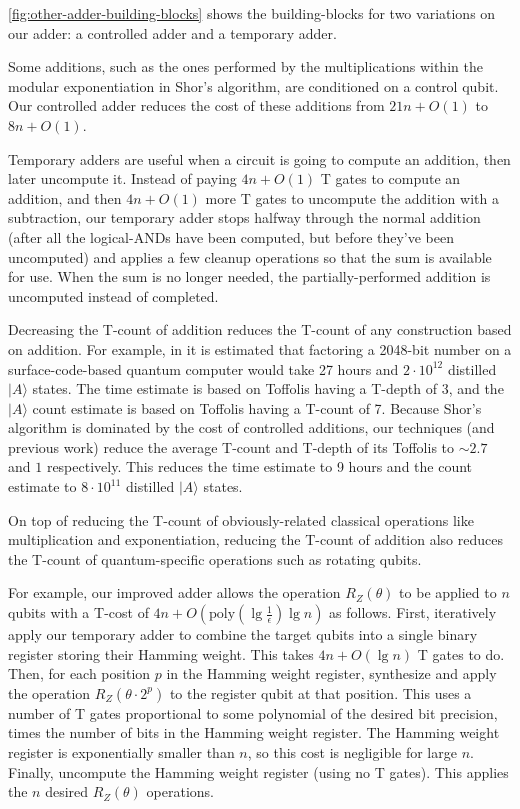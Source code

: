 \documentclass[twocolumn]{revtex4-1}
\begin{document}
\autoref{fig:other-adder-building-blocks} shows the building-blocks for two variations on our adder: a controlled adder and a temporary adder.

Some additions, such as the ones performed by the multiplications within the modular exponentiation in Shor's algorithm, are conditioned on a control qubit.
Our controlled adder reduces the cost of these additions from $21n + O(1)$ \citep{Coreas2017} to $8n + O(1)$.

Temporary adders are useful when a circuit is going to compute an addition, then later uncompute it.
Instead of paying $4n + O(1)$ T gates to compute an addition, and then $4n + O(1)$ more T gates to uncompute the addition with a subtraction, our temporary adder stops halfway through the normal addition (after all the logical-ANDs have been computed, but before they've been uncomputed) and applies a few cleanup operations so that the sum is available for use.
When the sum is no longer needed, the partially-performed addition is uncomputed instead of completed.


Decreasing the T-count of addition reduces the T-count of any construction based on addition.
For example, in \citep{Fowler2012} it is estimated that factoring a 2048-bit number on a surface-code-based quantum computer would take 27 hours and $2 \cdot 10^{12}$ distilled $|A\rangle$ states.
The time estimate is based on Toffolis having a T-depth of 3, and the $|A\rangle$ count estimate is based on Toffolis having a T-count of 7.
Because Shor's algorithm is dominated by the cost of controlled additions, our techniques (and previous work) reduce the average T-count and T-depth of its Toffolis to $\sim 2.7$ and $1$ respectively.
This reduces the time estimate to 9 hours and the count estimate to $8 \cdot 10^{11}$ distilled $|A\rangle$ states.

On top of reducing the T-count of obviously-related classical operations like multiplication and exponentiation, reducing the T-count of addition also reduces the T-count of quantum-specific operations such as rotating qubits.

For example, our improved adder allows the operation $R_Z(\theta)$ to be applied to $n$ qubits with a T-cost of $4n + O(\text{poly}(\lg \frac{1}{\epsilon}) \lg n)$ as follows.
First, iteratively apply our temporary adder to combine the target qubits into a single binary register storing their Hamming weight.
This takes $4n + O(\lg n)$ T gates to do.
Then, for each position $p$ in the Hamming weight register, synthesize and apply the operation $R_Z(\theta \cdot 2^p)$ to the register qubit at that position.
This uses a number of T gates proportional to some polynomial of the desired bit precision, times the number of bits in the Hamming weight register.
The Hamming weight register is exponentially smaller than $n$, so this cost is negligible for large $n$.
Finally, uncompute the Hamming weight register (using no T gates).
This applies the $n$ desired $R_Z(\theta)$ operations.
\end{document}
